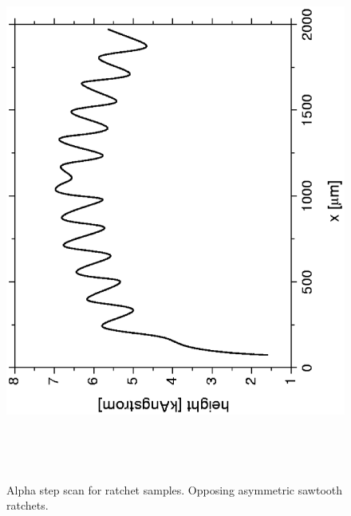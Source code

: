 
\begin{figure}[p]
\includegraphics[height=7.0in]{figs/prospective/fig3_a_lg.ps}
\caption{Alpha step scan for ratchet samples. Opposing asymmetric sawtooth
ratchets.}
\label{fig:ratchet_alpha_step_a}
\end{figure}

